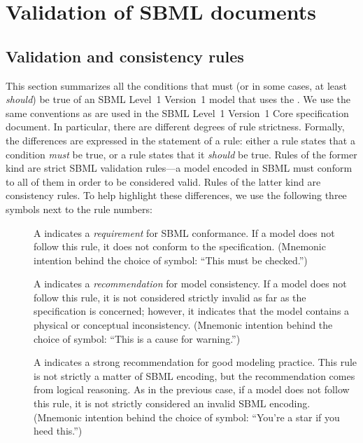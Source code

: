 
\section{Validation of SBML documents}
\label{apdx-validation}

\subsection{Validation and consistency rules}
\label{validation-rules}

This section summarizes all the conditions that must (or in some cases,
at least \emph{should}) be true of an SBML Level~1 Version~1 model that
uses the \TestTSBXMLLibraryPackage. We use the same conventions as are
used in the SBML Level~1 Version~1 Core specification document. In
particular, there are different degrees of rule strictness. Formally,
the differences are expressed in the statement of a rule: either a rule
states that a condition \emph{must} be true, or a rule states that it
\emph{should} be true. Rules of the former kind are strict SBML
validation rules---a model encoded in SBML must conform to all of them
in order to be considered valid. Rules of the latter kind are
consistency rules. To help highlight these differences, we use the
following three symbols next to the rule numbers:

\begin{description}

\item[\hspace*{6.5pt}\vSymbol\vsp] A \vSymbolName indicates a
\emph{requirement} for SBML conformance. If a model does not follow this
rule, it does not conform to the \TestTSBXMLLibraryPackage
specification. (Mnemonic intention behind the choice of symbol: ``This
must be checked.'')

\item[\hspace*{6.5pt}\cSymbol\csp] A \cSymbolName indicates a
\emph{recommendation} for model consistency. If a model does not follow
this rule, it is not considered strictly invalid as far as the
\TestTSBXMLLibraryPackage specification is concerned; however, it
indicates that the model contains a physical or conceptual
inconsistency. (Mnemonic intention behind the choice of symbol: ``This
is a cause for warning.'')

\item[\hspace*{6.5pt}\mSymbol\msp] A \mSymbolName indicates a strong
recommendation for good modeling practice. This rule is not strictly a
matter of SBML encoding, but the recommendation comes from logical
reasoning. As in the previous case, if a model does not follow this
rule, it is not strictly considered an invalid SBML encoding. (Mnemonic
intention behind the choice of symbol: ``You're a star if you heed
this.'')

\end{description}

